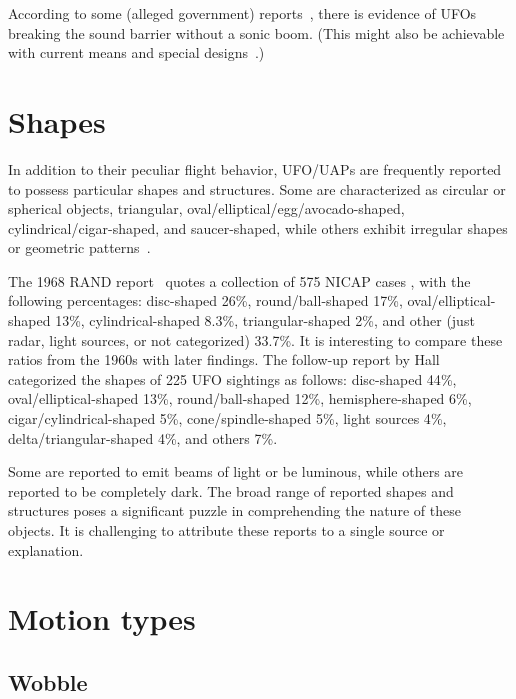 According to some (alleged government) reports~\cite{Daniels2021Mar,Pappas2021Mar},
there is evidence of UFOs breaking the sound barrier without a sonic boom.
(This might also be achievable with current means and special designs~\cite{Figliozzi2020Nov}.)


\section{Shapes}
\label{2023-UFO-part-Perception-flight-characteristics-sh}

In addition to their peculiar flight behavior, UFO/UAPs are frequently reported to possess particular shapes and structures. Some are characterized as circular or spherical objects, triangular, oval/elliptical/egg/avocado-shaped, cylindrical/cigar-shaped, and saucer-shaped, while others exhibit irregular shapes or geometric patterns~\cite[p.~12]{Hill2014Jun}.

The 1968 RAND report~\cite[p.~24]{Kocher-RAND-1968Jan} quotes a collection of 575 NICAP cases \cite{Hall1964}, with the following percentages:
disc-shaped 26{\%},
round/ball-shaped  17{\%},
oval/elliptical-shaped 13{\%},
cylindrical-shaped 8.3{\%},
triangular-shaped 2{\%},
and other (just radar, light sources, or not categorized) 33.7{\%}.
It is interesting to compare these ratios from the 1960s with later findings.
The follow-up report by Hall~\cite[p.~446]{Hall2001Jan} categorized the shapes of 225 UFO sightings as follows:
disc-shaped 44{\%},
oval/elliptical-shaped 13{\%},
round/ball-shaped  12{\%},
hemisphere-shaped 6{\%},
cigar/cylindrical-shaped   5{\%},
cone/spindle-shaped 5{\%},
light sources 4{\%},
delta/triangular-shaped 4{\%}, and
others 7{\%}.





Some are reported to emit beams of light or be luminous, while others are reported to be completely dark. The broad range of reported shapes and structures poses a significant puzzle in comprehending the nature of these objects. It is challenging to attribute these reports to a single source or explanation.



\section{Motion types}
\label{2023-UFO-part-Perception-flight-characteristics-mt}


\subsection{Wobble}

